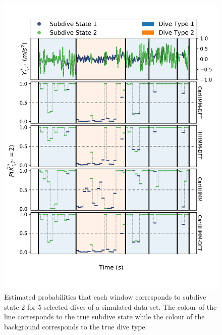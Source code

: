 \begin{figure}[ht]
    \centering
    \includegraphics[width=4.5in]{../Plots/Posterior_Fine_States.png}
    \caption{Estimated probabilities that each window corresponds to subdive state 2 for 5 selected dives of a simulated data set. The colour of the line corresponds to the true subdive state while the colour of the background corresponds to the true dive type.}
    \label{fig:acc_fine}
\end{figure}